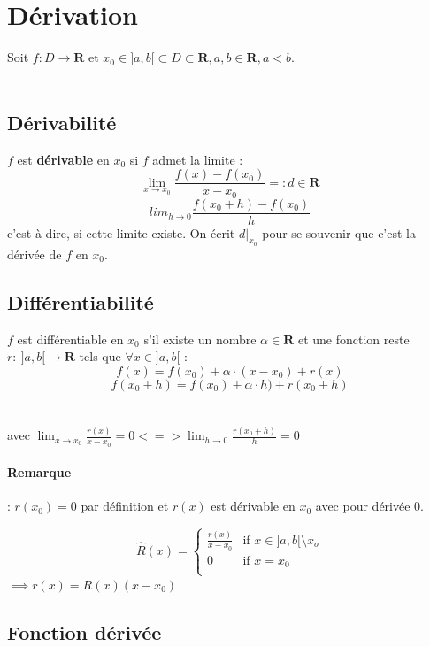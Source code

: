\documentclass{article}
\begin{document}
\section{Dérivation}

Soit $ f : D \to \mathbf{R} $ et $ x_0 \in ]a, b[ \subset D \subset \mathbf{R}, a, b \in \mathbf{R}, a < b $.\\\\

\subsection{Dérivabilité}

$ f $ est \textbf{dérivable} en $ x_0 $ si $ f $ admet la limite :
\[ \lim_{x\to{x_0}} \frac{f(x) - f(x_0)}{x - x_0} =: d \in \mathbf{R} \]
\[lim_{h\to{0}} \frac{f{(x_0 + h) - f(x_0)}}{h}\]
c'est à dire, si cette limite existe. On écrit $ d|_{x_0}$ pour se souvenir que c'est la dérivée de $ f $ en $ x_0 $.

\subsection{Différentiabilité}

$ f  $ est différentiable en $ x_0 $ s'il existe un nombre $ \alpha \in \mathbf{R} $ et une fonction reste $ r :\ ]a, b[ \to \mathbf{R} $ tels que $ \forall x \in ]a, b[ $ :
\[ f(x) = f(x_0) + \alpha \cdot (x - x_0) + r(x) \]
\[ f(x_0 + h) = f(x_0) + \alpha \cdot h) + r(x_0 + h) \]  \\\\
avec $ \lim_{x\to{x_0}} \frac{r(x)}{x-{x_0}} = 0 <=>  \lim_{h\to 0} \frac{r(x_0 + h)}{h} = 0 $
\paragraph{Remarque}: $ r(x_0) = 0 $ par définition et $ r(x) $ est dérivable en $ x_0 $ avec pour dérivée 0.

\begin{equation}
\hat{R}(x) = 
    \begin{cases}
         \frac{r(x)}{x-{x_0}} & \text{if } x \in ]a,b[ \setminus {x_o}\\
        0 & \text{if } x = x_0\\
    \end{cases}
\end{equation}
$\implies r(x) = R(x)(x - x_0) $
\subsection{Fonction dérivée}
\end{document}
